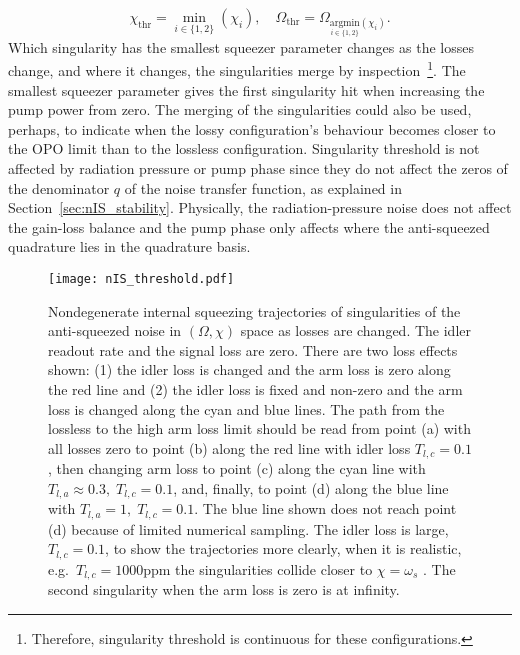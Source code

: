 \begin{equation}
\chi_\text{thr}=\min_{i\in\{1,2\}}(\chi_i),\quad\Omega_\text{thr}=\Omega_{\underset{i\in\{1,2\}}{\text{argmin}}(\chi_i)}.
\end{equation}
Which singularity has the smallest squeezer parameter changes as the losses change, and where it changes, the singularities merge by inspection~\footnote{Therefore, singularity threshold is continuous for these configurations.}. The smallest squeezer parameter gives the first singularity hit when increasing the pump power from zero. The merging of the singularities could also be used, perhaps, to indicate when the lossy configuration's behaviour becomes closer to the OPO limit than to the lossless configuration.
Singularity threshold is not affected by radiation pressure or pump phase since they do not affect the zeros of the denominator $q$ of the noise transfer function, as explained in Section~\ref{sec:nIS_stability}. Physically, the radiation-pressure noise does not affect the gain-loss balance and the pump phase only affects where the anti-squeezed quadrature lies in the quadrature basis.

\begin{figure}
    \centering
    \texttt{[image: nIS\_threshold.pdf]}
    \caption{ Nondegenerate internal squeezing trajectories of singularities of the anti-squeezed noise in $(\Omega, \chi)$ space as losses are changed. The idler readout rate and the signal loss are zero. There are two loss effects shown: (1) the idler loss is changed and the arm loss is zero along the red line and (2) the idler loss is fixed and non-zero and the arm loss is changed along the cyan and blue lines. 
    The path from the lossless to the high arm loss limit should be read from point (a) with all losses zero to point (b) along the red line with idler loss $T_{l,c}=0.1$, then changing arm loss to point (c) along the cyan line with $T_{l,a}\approx0.3,\;T_{l,c}=0.1$, and, finally, to point (d) along the blue line with $T_{l,a}=1,\;T_{l,c}=0.1$. The blue line shown does not reach point (d) because of limited numerical sampling.
    The idler loss is large, $T_{l,c}=0.1$, to show the trajectories more clearly, when it is realistic, e.g.\ $T_{l,c}=1000\text{ppm}$ the singularities collide closer to $\chi=\omega_s$ . The second singularity when the arm loss is zero is at infinity. }
    \label{fig:nIS_threshold_traj}
\end{figure}

